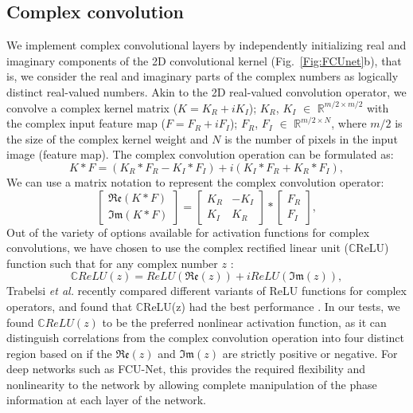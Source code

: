 \documentclass[%
 reprint,
superscriptaddress,
 amsmath,
 amssymb,
 prl,
]{revtex4-2}
\begin{document}
\subsection*{Complex convolution}

We implement complex convolutional layers by independently initializing real and imaginary components of the 2D convolutional kernel (Fig.~\ref{Fig:FCUnet}b), that is, we consider the real and imaginary parts of the complex numbers as logically distinct real-valued numbers. Akin to the 2D real-valued convolution operator, we convolve a complex kernel matrix (\(K = K_R + iK_I\)); $K_R$, $K_I$ $\in$ $\mathbb{R}^{m/2\times m/2}$  with the complex input feature map (\(F = F_R + iF_I\)); $F_R$, $F_I$ $\in$ $\mathbb{R}^{m/2\times N}$, where $m/2$ is the size of the complex kernel weight and $N$ is the number of pixels in the input image (feature map). The complex convolution operation can be formulated as:
\begin{equation}
    K * F 
    = 
    \left(
        K_R*F_R - K_I*F_I
    \right)
    +i(K_I*F_R + K_R*F_I),
\end{equation}
We can use a matrix notation to represent the complex convolution operator: %
\begin{equation}
\begin{bmatrix}
\mathfrak{Re}(K*F)\\
\mathfrak{Im}(K*F)
\end{bmatrix}
= 
        \begin{bmatrix}
K_R & -K_I\\
K_I & K_R
\end{bmatrix}
    *\begin{bmatrix}
F_R\\
F_I
\end{bmatrix},
\end{equation}
Out of the variety of options available for activation functions for complex convolutions, we have chosen to use the complex rectified linear unit  ($\mathbb{C}$ReLU) function such that for any complex number $z$ :
\begin{equation}
    \mathbb{C}ReLU(z)
    = 
    ReLU(\mathfrak{Re}(z)) +
    i ReLU(\mathfrak{Im}(z)),
\end{equation}
Trabelsi \textit {et al.} recently compared different variants of ReLU functions for complex operators, and found that $\mathbb{C}$ReLU(z) had the best performance \cite{trabelsi2017deep}. In our tests, we found $\mathbb{C}ReLU(z)$ to be the preferred nonlinear activation function, as it can distinguish correlations from the complex convolution operation into four distinct region based on if the $\mathfrak{Re}(z)$ and $\mathfrak{Im}(z)$ are strictly positive or negative. For deep networks such as FCU-Net, this provides the required flexibility and nonlinearity to the network by allowing complete manipulation of the phase information at each layer of the network.
\end{document}
